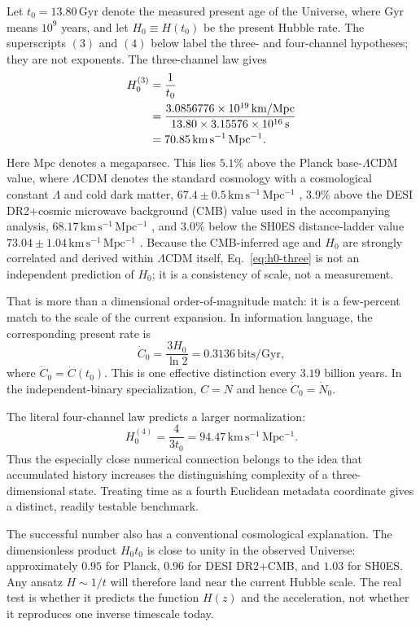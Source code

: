 \documentclass[10pt]{article}
\begin{document}
Let $t_0=13.80\,\mathrm{Gyr}$ denote the measured present age of the Universe,
where $\mathrm{Gyr}$ means $10^9$ years, and let $H_0\equiv H(t_0)$ be the
present Hubble rate.  The superscripts $(3)$ and $(4)$ below label the
three- and four-channel hypotheses; they are not exponents.  The three-channel
law gives
\begin{align}
H_0^{(3)}&=\frac{1}{t_0}\notag\\
&=\frac{3.0856776\times10^{19}\,\mathrm{km/Mpc}}
{13.80\times3.15576\times10^{16}\,\mathrm{s}}\notag\\
&=70.85\,\mathrm{km\,s^{-1}\,Mpc^{-1}}.
\label{eq:h0-three}
\end{align}
Here $\mathrm{Mpc}$ denotes a megaparsec.  This lies $5.1\%$ above the Planck
base-$\Lambda$CDM value, where $\Lambda$CDM denotes the standard cosmology with
a cosmological constant $\Lambda$ and cold dark matter,
$67.4\pm0.5\,\mathrm{km\,s^{-1}\,Mpc^{-1}}$ \citep{Planck2018}, $3.9\%$
above the DESI DR2+cosmic microwave background (CMB) value used in the
accompanying analysis, $68.17\,\mathrm{km\,s^{-1}\,Mpc^{-1}}$
\citep{DESI2025}, and $3.0\%$ below the SH0ES distance-ladder value
$73.04\pm1.04\,\mathrm{km\,s^{-1}\,Mpc^{-1}}$ \citep{Riess2022}.
Because the CMB-inferred age and $H_0$ are strongly correlated and derived
within $\Lambda$CDM itself, Eq.~\eqref{eq:h0-three} is not an independent
prediction of $H_0$; it is a consistency of scale, not a measurement.

That is more than a dimensional order-of-magnitude match: it is a few-percent
match to the scale of the current expansion.  In information language, the
corresponding present rate is
\[
\dot C_0=\frac{3H_0}{\ln2}=0.3136\,\mathrm{bits/Gyr},
\]
where $\dot C_0=\dot C(t_0)$.  This is one effective distinction every $3.19$
billion years.  In the independent-binary specialization, $C=N$ and hence
$\dot C_0=\dot N_0$.

The literal four-channel law predicts a larger normalization:
\[
H_0^{(4)}=\frac{4}{3t_0}
=94.47\,\mathrm{km\,s^{-1}\,Mpc^{-1}}.
\]
Thus the especially close numerical connection belongs to the idea that
accumulated history increases the distinguishing complexity of a
three-dimensional state.  Treating time as a fourth Euclidean metadata
coordinate gives a distinct, readily testable benchmark.

The successful number also has a conventional cosmological explanation.  The
dimensionless product $H_0t_0$ is close to unity in the observed Universe:
approximately $0.95$ for Planck, $0.96$ for DESI DR2+CMB, and $1.03$ for SH0ES.
Any ansatz $H\sim1/t$ will therefore land near the current Hubble scale.  The
real test is whether it predicts the function $H(z)$ and the acceleration, not
whether it reproduces one inverse timescale today.
\end{document}
